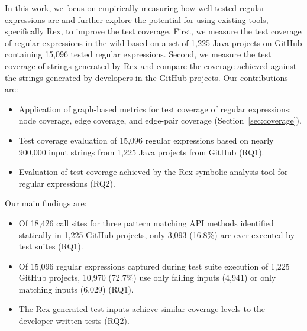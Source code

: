 In this work, we focus on empirically measuring how well tested regular expressions are and further explore the potential for using existing tools, specifically Rex, to improve the test coverage. 
First, we measure the test coverage of regular expressions in the wild based on a set of 1,225 Java projects on GitHub containing 15,096 tested regular expressions. Second, we measure the test coverage of strings generated by Rex and compare the coverage achieved against the strings generated by developers in the GitHub projects. %
Our contributions are:
\vspace{-3pt}
\begin{itemize} 
\item Application of graph-based metrics for test coverage of regular expressions: node coverage, edge coverage, and edge-pair coverage (Section~\ref{sec:coverage}).
\item Test coverage evaluation of 15,096 regular expressions based on nearly 900,000 input strings from 1,225 Java projects from GitHub (RQ1).
\item Evaluation of test coverage achieved by the Rex symbolic analysis tool for regular expressions (RQ2).
\end{itemize}
\vspace{-3pt}
Our main findings are:
\vspace{-3pt}
\begin{itemize}
\item Of 18,426 call sites for three pattern matching API methods identified statically in 1,225 GitHub projects, only 3,093 (16.8\%) are ever executed by test suites (RQ1).
\item Of 15,096 regular expressions captured during test suite execution of 1,225 GitHub projects, 10,970 (72.7\%) use only failing inputs (4,941) or only matching inputs (6,029) (RQ1). 
\item The Rex-generated test inputs achieve similar coverage levels to the developer-written tests (RQ2). 
\end{itemize}

